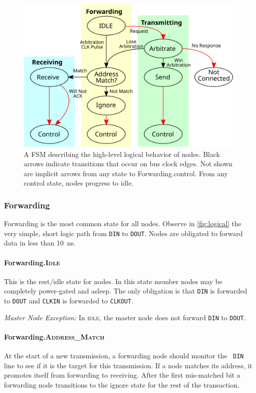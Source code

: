 \begin{figure}[h]
  \includegraphics[width=\linewidth]{img/fsm_diagram}
  \caption{A FSM describing the high-level logical behavior of \bus nodes.
    Black arrows indicate transitions that occur on bus clock edges. Not shown
    are implicit arrows from any state to Forwarding.{\sc control}. From any
    {\sc control} state, nodes progress to {\sc idle}.
    }
\end{figure}

\subsubsection{Forwarding}
Forwarding is the most common state for all \bus nodes. Observe in
\autoref{fig:logical} the very simple, short logic path from {\tt DIN} to
{\tt DOUT}. Nodes are obligated to forward data in less than 10~ns.

\paragraph{Forwarding.\textsc{Idle}}
This is the rest/idle state for \bus nodes. In this state member nodes may be
completely power-gated and asleep. The only obligation is that {\tt DIN} is
forwarded to {\tt DOUT} and {\tt CLKIN} is forwarded to {\tt CLKOUT}.

\medskip
\noindent
{\em Master Node Exception:} In \textsc{idle}, the master node does not
forward {\tt DIN} to {\tt DOUT}.

\paragraph{Forwarding.\textsc{Address\_Match}}
At the start of a new transmission, a forwarding node should monitor the {\tt
DIN} line to see if it is the target for this transmission. If a node matches
its address, it promotes itself from forwarding to receiving. After the first
mis-matched bit a forwarding node transitions to the {\sc ignore} state for
the rest of the transaction.

